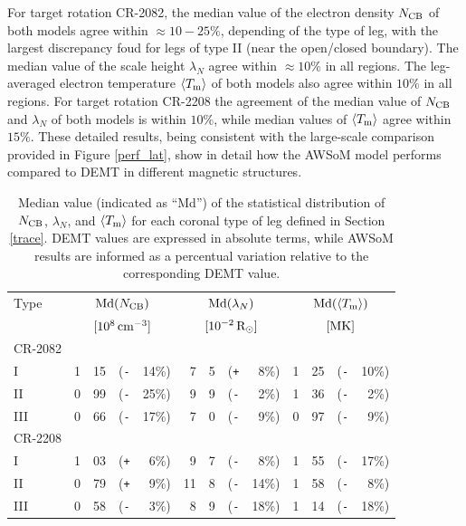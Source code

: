 \documentclass[namedreferences]{solarphysics}
\newcommand{\mrsun}{{\rm R_\odot}}
\newcommand{\med}{{\rm Md}}
\newcommand{\avgTe}{\left<\Tm\right>}
\newcommand{\MK}{{\rm MK}}
\newcommand{\lN}{\lambda_N}
\newcommand{\NCB}{N_{\rm CB}}
\newcommand{\Tm}{T_{\rm m}}
\newcommand{\aTm}{\left<\Tm\right>}
\newcommand{\Pl}{\texttt{+}}
\newcommand{\Mi}{\texttt{-}}
\begin{document}
\begin{article}
{For target rotation CR-2082, the median value of the electron density $\NCB$ of both models agree within $\approx 10-25\%$, {depending of the type of leg, with the largest discrepancy foud for legs of type II (near the open/closed boundary). The} median value of the scale height $\lN$ agree {within $\approx 10\%$ in all regions}. The leg-averaged electron temperature $\aTm$ of both models also agree {within $10\%$ in all regions}. For target rotation CR-2208 the agreement of the median value of $\NCB$ and $\lN$ of both models {is within $10\%$, while} median values of $\aTm$ agree within $15\%$. {These detailed results, being consistent with the large-scale comparison provided in Figure \ref{perf_lat}, show in detail how the AWSoM model performs compared to DEMT in different magnetic structures.}}


\begin{table}
\begin{tabular}{l r@{.}l@{\hskip 0.05in} r@{\hskip 0.01in} r  r@{.}l@{\hskip 0.05in} r@{\hskip 0.01in} r r@{.}l@{\hskip 0.05in} r@{\hskip 0.01in} r }
\hline
Type    & \multicolumn{4}{c}{$\med(\NCB)$}             & \multicolumn{4}{c}{$\med(\lN)$} & \multicolumn{4}{c}{$\med(\avgTe)$} \\
        & \multicolumn{4}{c}{$[10^8\,{\rm cm}^{-3}]$}  & \multicolumn{4}{c}{$[{\rm 10}^{-2}\,\mrsun]$} & \multicolumn{4}{c}{$[\MK]$} \\
\hline
CR-2082\\
I    & 1&15 &(\Mi&14\%)  &   7&5 &(\Pl&~8\%) &   1&25 &(\Mi&10\%) \\
II   & 0&99 &(\Mi&25\%)  &   9&9 &(\Mi&~2\%) &   1&36 &(\Mi&~2\%) \\
III  & 0&66 &(\Mi&17\%)  &   7&0 &(\Mi&~9\%) &   0&97 &(\Mi&~9\%) \\
\hline          
CR-2208\\
I    & 1&03 &(\Pl&~6\%)  &   9&7 &(\Mi&~8\%) &   1&55 &(\Mi&17\%) \\
II   & 0&79 &(\Pl&~9\%)  &  11&8 &(\Mi&14\%) &   1&58 &(\Mi&~8\%) \\
III  & 0&58 &(\Mi&~3\%)  &   8&9 &(\Mi&18\%) &   1&14 &(\Mi&18\%) \\
\hline   
\end{tabular}
\caption{Median value (indicated as ``Md'') of the statistical distribution of $\NCB$, $\lN$, and $\aTm$ for each coronal type of leg defined in Section \ref{trace}. DEMT values are expressed in absolute terms, while AWSoM results are informed as a percentual variation relative to the corresponding DEMT value.}
\label{tabla_comp}
\end{table}


\end{article}
\end{document}

